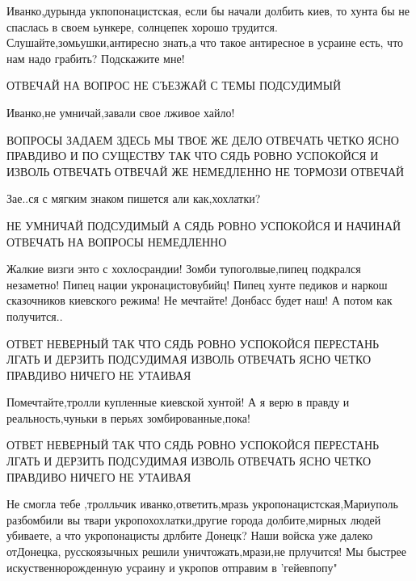 \qqPodsudimyj

Иванко,дурында укпопонацистская, если бы начали долбить киев, то хунта бы не
спаслась в своем ьункере, солнцепек хорошо трудится.
Слушайте,зомьушки,антиресно знать,а что такое антиресное в усраине есть, что
нам надо грабить? Подскажите мне!

\qqSledovatel

ОТВЕЧАЙ НА ВОПРОС НЕ СЪЕЗЖАЙ С ТЕМЫ ПОДСУДИМЫЙ

\qqPodsudimyj

Иванко,не умничай,завали свое лживое хайло!

\qqSledovatel

ВОПРОСЫ ЗАДАЕМ ЗДЕСЬ МЫ ТВОЕ ЖЕ ДЕЛО ОТВЕЧАТЬ ЧЕТКО ЯСНО ПРАВДИВО И ПО СУЩЕСТВУ
ТАК ЧТО СЯДЬ РОВНО УСПОКОЙСЯ И ИЗВОЛЬ ОТВЕЧАТЬ ОТВЕЧАЙ ЖЕ НЕМЕДЛЕННО НЕ ТОРМОЗИ
ОТВЕЧАЙ

\qqPodsudimyj

Зае..ся с мягким знаком пишется али как,хохлатки?

\qqSledovatel

НЕ УМНИЧАЙ ПОДСУДИМЫЙ А СЯДЬ РОВНО УСПОКОЙСЯ И НАЧИНАЙ ОТВЕЧАТЬ НА ВОПРОСЫ НЕМЕДЛЕННО

\qqSledovatel

\qqSudVopros

\qqPodsudimyj

Жалкие визги энто с хохлосрандии! Зомби тупоголвые,пипец подкрался незаметно!
Пипец нации укронацистовубийц! Пипец хунте педиков и наркош сказочников
киевского режима! Не мечтайте! Донбасс будет наш! А потом как получится..

\qqSledovatel

ОТВЕТ НЕВЕРНЫЙ ТАК ЧТО СЯДЬ РОВНО УСПОКОЙСЯ ПЕРЕСТАНЬ ЛГАТЬ И ДЕРЗИТЬ
ПОДСУДИМАЯ ИЗВОЛЬ ОТВЕЧАТЬ ЯСНО ЧЕТКО ПРАВДИВО НИЧЕГО НЕ УТАИВАЯ

\qqPodsudimyj

Помечтайте,тролли купленные киевской хунтой! А я верю в правду и
реальность,чуньки в перьях зомбированные,пока!

\qqSledovatel

ОТВЕТ НЕВЕРНЫЙ ТАК ЧТО СЯДЬ РОВНО УСПОКОЙСЯ ПЕРЕСТАНЬ ЛГАТЬ И ДЕРЗИТЬ
ПОДСУДИМАЯ ИЗВОЛЬ ОТВЕЧАТЬ ЯСНО ЧЕТКО ПРАВДИВО НИЧЕГО НЕ УТАИВАЯ

\qqSledovatel

\qqSudVopros

\qqPodsudimyj

Не смогла тебе ,тролльчик иванко,ответить,мразь укропонацистская,Мариуполь
разбомбили вы твари укропохохлатки,другие города долбите,мирных людей убиваете,
а что укропонацисты дрлбите Донецк? Наши войска уже далеко отДонецка,
русскоязычных решили уничтожать,мрази,не прлучится! Мы быстрее
искуственнорожденную усраину и укропов отправим в 'гейевпопу"

